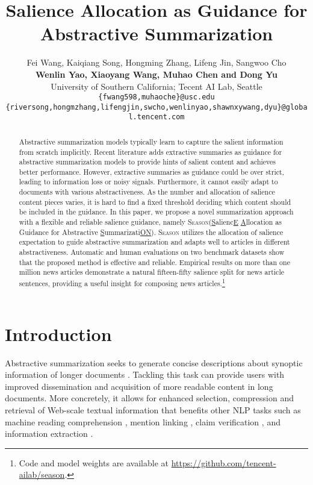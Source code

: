 \documentclass[11pt]{article}
\title{Salience Allocation as Guidance for Abstractive Summarization}
\author{
  Fei Wang, Kaiqiang Song, Hongming Zhang, Lifeng Jin, Sangwoo Cho \\ 
  \textbf{Wenlin Yao, Xiaoyang Wang,  Muhao Chen and Dong Yu}
 \\
  University of Southern California;\; Tecent AI Lab, Seattle\\
  \small \texttt{\{fwang598,muhaoche\}@usc.edu} \\ 
  \small \texttt{\{riversong,hongmzhang,lifengjin,swcho,wenlinyao,shawnxywang,dyu\}@global.tencent.com}}
\newcommand{\MODEL}{\mbox{\textsc{Season}}\xspace}
\begin{document}
\maketitle

\renewcommand{\thefootnote}{\fnsymbol{footnote}}
\renewcommand{\thefootnote}{\arabic{footnote}}

\begin{abstract}

Abstractive summarization models typically learn to capture the salient information from scratch implicitly.
Recent literature adds extractive summaries as guidance for abstractive summarization models to provide hints of salient content and achieves better performance.
However, extractive summaries as guidance could be over strict, leading to information loss or noisy signals.
Furthermore, it cannot easily adapt to documents with various abstractiveness.
As the number and allocation of salience content pieces varies, it is hard to find a fixed threshold deciding which content should be included in the guidance.
In this paper, we propose a novel summarization approach with a flexible and reliable salience guidance, namely \MODEL ({\underline{S}}alienc{\underline{E}} {\underline{A}}llocation as Guidance for Abstractive {\underline{S}}ummarizati{\underline{ON}}).
\MODEL utilizes the allocation of salience expectation to guide abstractive summarization and adapts well to articles in different abstractiveness.
Automatic and human evaluations on two benchmark datasets show that the proposed method is effective and reliable.
Empirical results on more than one million news articles demonstrate a natural fifteen-fifty salience split for news article sentences, providing a useful insight for composing news articles.\footnote{Code and model weights are available at \url{https://github.com/tencent-ailab/season}.}

\end{abstract}
 \section{Introduction}




Abstractive summarization seeks to generate concise descriptions about synoptic information of longer documents
\cite{rush2015neural,nallapati2016abstractive,see2017get}. Tackling this task can provide users with improved dissemination and acquisition of more readable content in long documents.
More concretely, it allows for enhanced selection, compression and retrieval of Web-scale textual information that benefits other NLP tasks such as machine reading comprehension \cite{inoue-etal-2021-summarize}, mention linking \cite{cheng2015summarizing}, claim verification \cite{yin-etal-2021-docnli}, and information extraction \cite{lu2022summarization}.
\end{document}

